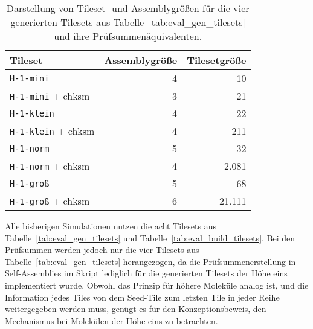 \begin{table}
    \centering 
    \begin{tabular}{lrr}
        Tileset & Assemblygröße & Tilesetgröße \\\hline
        \texttt{H-1-mini} & 4 & 10 \\
        \texttt{H-1-mini} + chksm & 3 & 21 \\
        \texttt{H-1-klein} & 4 & 22 \\
        \texttt{H-1-klein} + chksm & 4 & 211 \\
        \texttt{H-1-norm} & 5 & 32 \\
        \texttt{H-1-norm} + chksm & 4 & 2.081 \\
        \texttt{H-1-groß} & 5 & 68 \\
        \texttt{H-1-groß} + chksm & 6 & 21.111 \\\hline
    \end{tabular}
    \caption[Tileset- und Assemblygrößen für die generierten Tilesets]{Darstellung von Tileset- und Assemblygrößen für die vier generierten Tilesets aus Tabelle~\ref{tab:eval_gen_tilesets} und ihre Prüfsummenäquivalenten.}
    \label{tab:chksm_growth}
\end{table}

Alle bisherigen Simulationen nutzen die acht Tilesets aus Tabelle~\ref{tab:eval_gen_tilesets} und Tabelle~\ref{tab:eval_build_tilesets}. Bei den Prüfsummen werden jedoch nur die vier Tilesets aus Tabelle~\ref{tab:eval_gen_tilesets} herangezogen, da die Prüfsummenerstellung in Self-Assemblies im Skript lediglich für die generierten Tilesets der Höhe eins implementiert wurde. Obwohl das Prinzip für höhere Moleküle analog ist, und die Information jedes Tiles von dem Seed-Tile zum letzten Tile in jeder Reihe weitergegeben werden muss, genügt es für den Konzeptionsbeweis, den Mechanismus bei Molekülen der Höhe eins zu betrachten.

